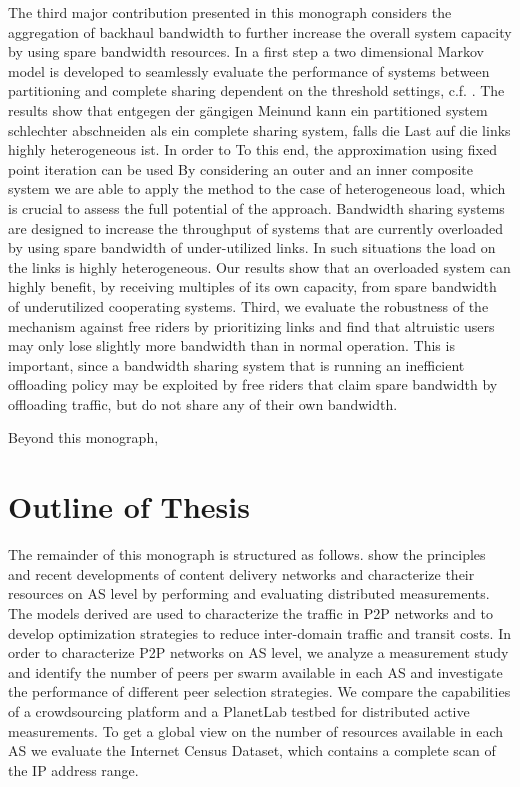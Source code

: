 The third major contribution presented in this monograph considers the aggregation of backhaul bandwidth to further increase the overall system capacity by using spare bandwidth resources.
In a first step a two dimensional Markov model is developed to seamlessly evaluate the performance of systems between partitioning and complete sharing dependent on the threshold settings, c.f. \cite{burger2016phycom}.
The results show that entgegen der gängigen Meinund kann ein partitioned system schlechter abschneiden als ein complete sharing system, falls die Last auf die links highly heterogeneous ist.
In order to
To this end, the approximation using fixed point iteration can be used
By considering an outer and an inner composite system we are able to apply the method to the case of heterogeneous load, which is crucial to assess the full potential of the approach.
Bandwidth sharing systems are designed to increase the throughput of systems that are currently overloaded by using spare bandwidth of under-utilized links.
In such situations the load on the links is highly heterogeneous.
Our results show that an overloaded system can highly benefit, by receiving multiples of its own capacity, from spare bandwidth of underutilized cooperating systems.
Third, we evaluate the robustness of the mechanism against free riders by prioritizing links and find that altruistic users may only lose slightly more bandwidth than in normal operation.
This is important, since a bandwidth sharing system that is running an inefficient offloading policy may be exploited by free riders that claim spare bandwidth by offloading traffic, but do not share any of their own bandwidth.

Beyond this monograph,

\section{Outline of Thesis}\label{sec:introduction:outline}

The remainder of this monograph is structured as follows.
 show the principles and recent developments of content delivery networks and characterize their resources on AS level by performing and evaluating distributed measurements.
The models derived are used to characterize the traffic in P2P networks and to develop optimization strategies to reduce inter-domain traffic and transit costs.
In order to characterize P2P networks on AS level, we analyze a measurement study and identify the number of peers per swarm available in each AS and investigate the performance of different peer selection strategies.
We compare the capabilities of a crowdsourcing platform and a PlanetLab testbed for distributed active measurements.
To get a global view on the number of resources available in each AS we evaluate the Internet Census Dataset, which contains a complete scan of the IP address range.

